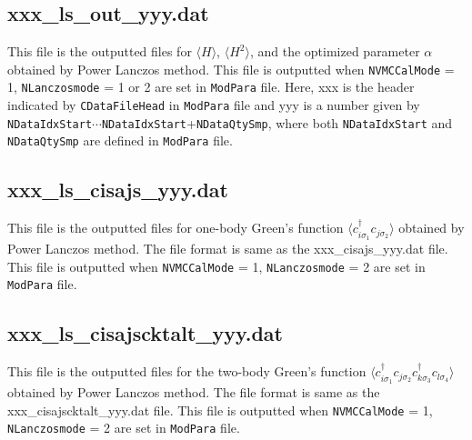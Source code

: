 \subsection{xxx\_ls\_out\_yyy.dat }
This file is the outputted files for $\langle H \rangle$, $\langle H^2\rangle$, and the optimized parameter $\alpha$ obtained by Power Lanczos method. 
This file is outputted when \verb|NVMCCalMode| = 1, \verb|NLanczosmode| = 1 or 2 are set in \verb|ModPara| file.
Here, xxx is the header indicated by \verb|CDataFileHead| in \verb|ModPara| file and yyy is a number given by \verb|NDataIdxStart|$\cdots$\verb|NDataIdxStart|+\verb|NDataQtySmp|, where both \verb|NDataIdxStart| and \verb|NDataQtySmp| are defined in \verb|ModPara| file.

\subsection{xxx\_ls\_cisajs\_yyy.dat }
This file is the outputted files for one-body Green's function $\langle c_{i\sigma_1}^{\dagger}c_{j\sigma_2}\rangle$ obtained by Power Lanczos method. The file format is same as the {xxx\_cisajs\_yyy.dat} file. This file is outputted when \verb|NVMCCalMode| = 1, \verb|NLanczosmode| = 2 are set in \verb|ModPara| file.

\subsection{xxx\_ls\_cisajscktalt\_yyy.dat }
This file is the outputted files for the two-body Green's function $\langle c_{i\sigma_1}^{\dagger}c_{j\sigma_2}c_{k\sigma_3}^{\dagger}c_{l\sigma_4}\rangle$ obtained by Power Lanczos method. The file format is same as the {xxx\_cisajscktalt\_yyy.dat} file. This file is outputted when \verb|NVMCCalMode| = 1, \verb|NLanczosmode| = 2 are set in \verb|ModPara| file.
